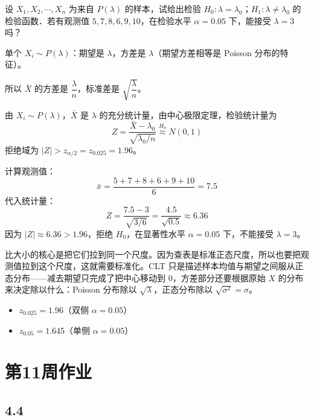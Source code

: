 \begin{homework}[2]
设 $X_1, X_2, \cdots, X_n$ 为来自 $P(\lambda)$ 的样本，试给出检验 $H_0: \lambda = \lambda_0$；$H_1: \lambda \neq \lambda_0$ 的检验函数．若有观测值 $5, 7, 8, 6, 9, 10$，在检验水平 $\alpha = 0.05$ 下，能接受 $\lambda = 3$ 吗？
\end{homework}
\begin{note}
单个 $X_i \sim P(\lambda)$：期望是 $\lambda$，方差是 $\lambda$（期望方差相等是 Poisson 分布的特征）。

所以 $\bar{X}$ 的方差是 $\dfrac{\lambda}{n}$，标准差是 $\sqrt{\dfrac{\lambda}{n}}$。
\end{note}
\begin{solution}
由 $X_i \sim P(\lambda)$，$\bar{X}$ 是 $\lambda$ 的充分统计量，由中心极限定理，检验统计量为
\[
Z = \frac{\bar{X} - \lambda_0}{\sqrt{\lambda_0 / n}} \overset{H_0}{\approx} N(0,1)
\]
拒绝域为 $|Z| > z_{\alpha/2} = z_{0.025} = 1.96$。

计算观测值：
\[
\bar{x} = \frac{5+7+8+6+9+10}{6} = 7.5
\]
代入统计量：
\[
Z = \frac{7.5 - 3}{\sqrt{3/6}} = \frac{4.5}{\sqrt{0.5}} \approx 6.36
\]
因为 $|Z| \approx 6.36 > 1.96$，拒绝 $H_0$，在显著性水平 $\alpha = 0.05$ 下，不能接受 $\lambda = 3$。
\end{solution}
\begin{dxtips}
    比大小的核心是把它们拉到同一个尺度。因为查表是标准正态尺度，所以也要把观测值拉到这个尺度，这就需要标准化。CLT 只是描述样本均值与期望之间服从正态分布——减去期望只完成了把中心移动到 $0$，方差部分还要根据原始 $X$ 的分布来决定除以什么：Poisson 分布除以 $\sqrt{\lambda}$，正态分布除以 $\sqrt{\sigma^2} = \sigma$。
\end{dxtips}
\begin{itemize}
    \item $z_{0.025} = 1.96$（双侧 $\alpha = 0.05$）
    \item $z_{0.05} = 1.645$（单侧 $\alpha = 0.05$）
\end{itemize}
\section{第11周作业}
\subsection{4.4}

